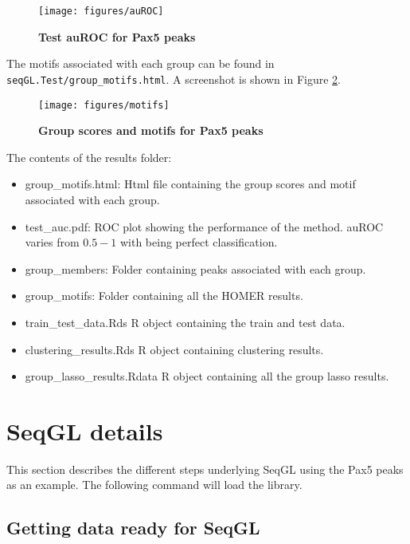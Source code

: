 \documentclass[10pt,oneside]{article}\usepackage[]{graphicx}\usepackage[]{color}
\begin{document}
\begin{figure}[h!]
\begin{center}
\texttt{[image: figures/auROC]}
\end{center}
\caption{\textbf{Test auROC for Pax5 peaks}}\label{fig:fig1}
\end{figure}

The motifs associated with each group can be found in \texttt{seqGL.Test/group\_motifs.html}. A screenshot is shown in Figure \ref{fig:fig2}.
\begin{figure}[h!]
\begin{center}
\texttt{[image: figures/motifs]}
\end{center}
\caption{\textbf{Group scores and motifs for Pax5 peaks}}\label{fig:fig2}
\end{figure}

\pagebreak

The contents of the results folder:
\begin{itemize}
\item group\_motifs.html: Html file containing the group scores and motif associated with each group.
\item test\_auc.pdf: ROC plot showing the performance of the method. auROC varies from $0.5-1$ with being perfect classification.
\item group\_members: Folder containing peaks associated with each group.
\item group\_motifs: Folder containing all the HOMER results.
\item train\_test\_data.Rds R object containing the train and test data.
\item clustering\_results.Rds R object containing clustering results.
\item group\_lasso\_results.Rdata R object containing all the group lasso results.
\end{itemize}


\section{SeqGL details}
This section describes the different steps underlying SeqGL using the Pax5 peaks as an example. The following command will load the library.



\subsection{Getting data ready for SeqGL}
\end{document}
